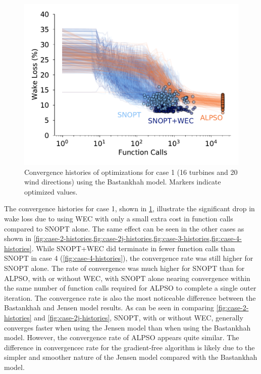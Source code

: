 \documentclass{jpconf}
\begin{document}
\begin{figure}[h!]
	\centering
	\begin{minipage}[t]{.45\textwidth}
		\centering
		\includegraphics[width=\textwidth]{final_images/results/convergence_history_BPAmodel_16turbs_20dirs}  
		\caption{Convergence histories of optimizations for case 1 (16 turbines and 20 wind directions) using the Bastankhah model. Markers indicate optimized values.}
		\label{fig:case-1-histories}
	\end{minipage}
\end{figure}

The convergence histories for case 1, shown in \cref{fig:case-1-histories}, illustrate the significant drop in wake loss due to using WEC with only a small extra cost in function calls compared to SNOPT alone. The same effect can be seen in the other cases as shown in \cref{fig:case-2-histories,fig:case-2j-histories,fig:case-3-histories,fig:case-4-histories}. While SNOPT+WEC did terminate in fewer function calls than SNOPT in case 4 (\cref{fig:case-4-histories}), the convergence rate was still higher for SNOPT alone. The rate of convergence was much higher for SNOPT than for ALPSO, with or without WEC, with SNOPT alone nearing convergence within the same number of function calls required for ALPSO to complete a single outer iteration. The convergence rate is also the most noticeable difference between the Bastankhah and Jensen model results. As can be seen in comparing \cref{fig:case-2-histories} and \cref{fig:case-2j-histories}, SNOPT, with or without WEC, generally converges faster when using the Jensen model than when using the Bastankhah model. However, the convergence rate of ALPSO appears quite similar. The difference in convergencec rate for the gradient-free algorithm is likely due to the simpler and smoother nature of the Jensen model compared with the Bastankhah model.
\end{document}
